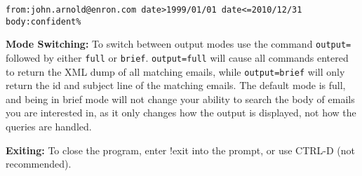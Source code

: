 \verb|from:john.arnold@enron.com date>1999/01/01 date<=2010/12/31 body:confident%|

\textbf{Mode Switching: }
To switch between output modes use the command \verb|output=| followed by either \verb|full| or 
\verb|brief|.  \verb|output=full| will cause all commands entered to return the XML dump of all 
matching emails, while \verb|output=brief| will only return the id and subject line of the matching 
emails.  The default mode is full, and being in brief mode will not change your ability to search 
the body of emails you are interested in, as it only changes how the output is displayed, not how 
the queries are handled. 

\textbf{Exiting: }
To close the program, enter !exit into the prompt, or use CTRL-D (not recommended).   
